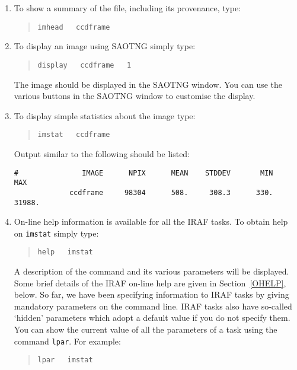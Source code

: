 \documentclass[twoside,11pt]{article}
\begin{document}
\begin{enumerate}
  \item To show a summary of the file, including its provenance, type:

  \begin{quote}
   {\tt imhead ~ ccdframe}
  \end{quote}

  \item To display an image using SAOTNG simply type:

  \begin{quote}
   {\tt display ~ ccdframe ~ 1}
  \end{quote}

   The image should be displayed in the SAOTNG window.  You can
   use the various buttons in the SAOTNG window to customise the
   display.

  \item To display simple statistics about the image type:

  \begin{quote}
   {\tt imstat ~ ccdframe}
  \end{quote}

   Output similar to the following should be listed:

  \begin{verbatim}
#               IMAGE      NPIX      MEAN    STDDEV       MIN       MAX
             ccdframe     98304      508.     308.3      330.    31988.
  \end{verbatim}

  \item On-line help information is available for all the IRAF tasks.
   To obtain help on {\tt imstat} simply type:

  \begin{quote}
   {\tt help ~ imstat}
  \end{quote}

   A description of the command and its various parameters will be
   displayed.  Some brief details of the IRAF on-line help are given in
   Section~\ref{OHELP}, below.  So far, we have been specifying information
   to IRAF tasks by giving mandatory parameters on the command line.  IRAF
   tasks also have so-called `hidden' parameters which adopt a default value
   if you do not specify them.  You can show the current value of all the
   parameters of a task using the command {\tt lpar}.  For example:

  \begin{quote}
   {\tt lpar ~ imstat}
  \end{quote}


\end{enumerate}
\end{document}
